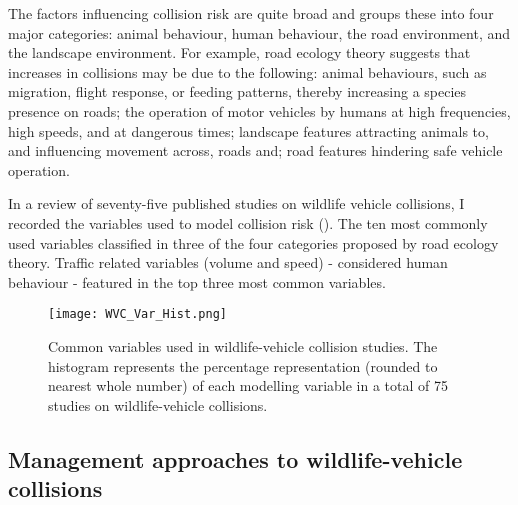 The factors influencing collision risk are quite broad and \cite{form03} groups these into four major categories: animal behaviour, human behaviour, the road environment, and the landscape environment. For example, road ecology theory suggests that increases in collisions may be due to the following: animal behaviours, such as migration, flight response, or feeding patterns, thereby increasing a species presence on roads; the operation of motor vehicles by humans at high frequencies, high speeds, and at dangerous times; landscape features attracting animals to, and influencing movement across, roads and; road features hindering safe vehicle operation.

In a review of seventy-five published studies on wildlife vehicle collisions, I recorded the variables used to model collision risk (). The ten most commonly used variables classified in three of the four categories proposed by road ecology theory. Traffic related variables (volume and speed) - considered human behaviour - featured in the top three most common variables.

\begin{figure*}[htp]
  \centering
  \texttt{[image: WVC\_Var\_Hist.png]}
  \caption[Variables used in wildlife-vehicle collision studies]{Common variables used in wildlife-vehicle collision studies. The histogram represents the percentage representation (rounded to nearest whole number) of each modelling variable in a total of 75 studies on wildlife-vehicle collisions.}
  \label{wvc_studies}
\end{figure*}

\subsection{Management approaches to wildlife-vehicle collisions}


